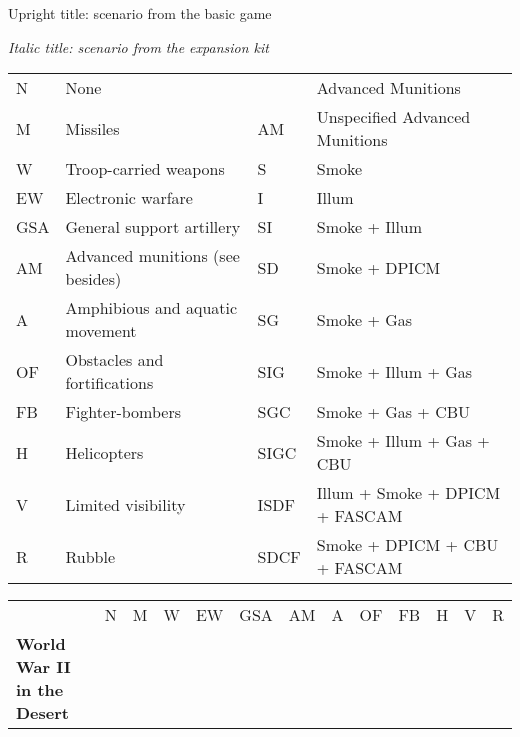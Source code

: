 \documentclass[a4paper]{article}
\newenvironment{texte}{\rmfamily\footnotesize}{}
\begin{document}
\begin{texte}


Upright title: scenario from the basic game

\textit{Italic title: scenario from the expansion kit}

\vspace*{5mm}

\begin{tabular}{llll}
N    &   None                             &      & Advanced Munitions\\
M    &   Missiles                         & AM   & Unspecified Advanced Munitions \\
W    &   Troop-carried weapons            & S    & Smoke\\
EW   &   Electronic warfare               & I    & Illum \\
GSA  &   General support artillery        & SI   & Smoke + Illum \\
AM   &   Advanced munitions (see besides) & SD   & Smoke + DPICM \\
A    &   Amphibious and aquatic movement  & SG   & Smoke + Gas   \\
OF   &   Obstacles and fortifications     & SIG  & Smoke + Illum + Gas   \\
FB   &   Fighter-bombers                  & SGC  & Smoke + Gas + CBU \\
H    &   Helicopters                      & SIGC & Smoke + Illum + Gas + CBU      \\
V    &   Limited visibility               & ISDF & Illum + Smoke + DPICM + FASCAM \\
R    &   Rubble                           & SDCF & Smoke + DPICM + CBU   + FASCAM \\
\end{tabular}

\begin{tabular}{lcccccccccccc}
                                                   & N &  M &  W & EW & GSA & AM & A & OF & FB & H &  V & R \\

\bf World War II in the Desert \\


\end{tabular}
\end{texte}
\end{document}
